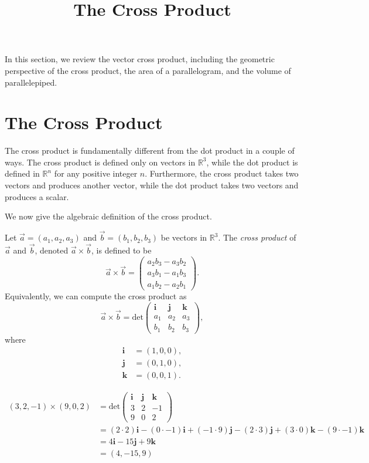 \documentclass{ximera}
\title{The Cross Product}
\begin{document}
  
\begin{abstract}  
\end{abstract}  
\maketitle 

In this section, we review the vector cross product, including the geometric perspective of the cross product, the area of a parallelogram, and the volume of parallelepiped.

\section*{The Cross Product}

The cross product is fundamentally different from the dot product in a couple of ways. The cross product is defined only on vectors in $\mathbb{R}^3$, while the dot product is defined in $\mathbb{R}^n$ for any positive integer $n$. Furthermore, the cross product takes two vectors and produces another vector, while the dot product takes two vectors and produces a scalar.

We now give the algebraic definition of the cross product.

\begin{definition}
Let $\vec{a}=(a_1,a_2,a_3)$ and $\vec{b}=(b_1,b_2,b_3)$ be vectors in $\mathbb{R}^3$. The \emph{cross product} of $\vec{a}$ and $\vec{b}$, denoted $\vec{a}\times\vec{b}$, is defined to be
\[
\vec{a}\times\vec{b}=\left(\begin{array}{c}a_2b_3-a_3b_2\\a_3b_1-a_1b_3\\a_1b_2-a_2b_1\end{array}\right).
\]
Equivalently, we can compute the cross product as
\[
\vec{a}\times\vec{b}=\textrm{det}\left(\begin{array}{ccc}\mathbf{i}&\mathbf{j}&\mathbf{k}\\a_1&a_2&a_3\\b_1&b_2&b_3\end{array}\right),
\]
where
\begin{align*}
\mathbf{i}&=(1,0,0),\\
\mathbf{j}&=(0,1,0),\\
\mathbf{k}&=(0,0,1).
\end{align*}
\end{definition}

\begin{example}
\begin{align*}
(3,2,-1)\times(9,0,2) &= \textrm{det}\left(\begin{array}{ccc}\textbf{i}&\textbf{j}&\textbf{k}\\3&2&-1\\9&0&2\end{array}\right)\\
&= (2\cdot 2)\mathbf{i} - (0\cdot -1)\mathbf{i} + (-1\cdot 9)\mathbf{j} - (2\cdot 3)\mathbf{j}+(3\cdot 0)\mathbf{k} - (9\cdot -1)\mathbf{k}\\
&= 4\mathbf{i}-15\mathbf{j}+9\mathbf{k}\\
&= (4,-15, 9)
\end{align*}
\end{example}
\end{document}
